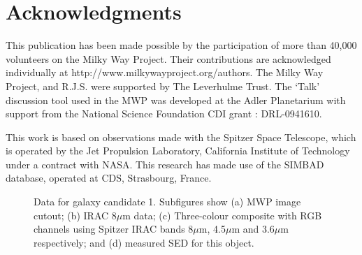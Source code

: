 \documentclass[times,usenatbib]{mn2e}
\begin{document}
\section*{Acknowledgments}

This publication has been made possible by the participation of more than 40,000 volunteers on the Milky Way Project. Their contributions are acknowledged individually at http://www.milkywayproject.org/authors. The Milky Way Project, and R.J.S. were supported by The Leverhulme Trust. The `Talk' discussion tool used in the MWP was developed at the Adler Planetarium with support from the National Science Foundation CDI grant : DRL-0941610. 

This work is based on observations made with the Spitzer Space Telescope, which is operated by the Jet Propulsion Laboratory, California Institute of Technology under a contract with NASA. This research has made use of the SIMBAD database, operated at CDS, Strasbourg, France.




\clearpage


\begin{figure}
\begin{center}
\caption{Data for galaxy candidate 1. Subfigures show (a) MWP image cutout; (b) IRAC 8$\mu$m data; (c) Three-colour composite with RGB channels using Spitzer IRAC bands 8$\mu$m, 4.5$\mu$m and 3.6$\mu$m respectively; and (d) measured SED for this object.}
\label{gal1}
\end{center}
\end{figure} 
\end{document}
